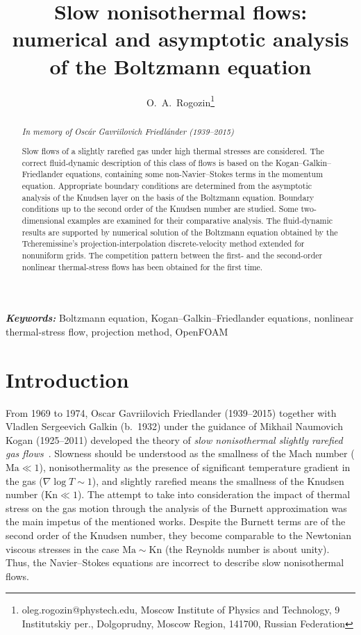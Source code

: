 \documentclass[10pt]{article}
\title{Slow nonisothermal flows: numerical and asymptotic analysis of the Boltzmann equation}
\author{O.~A.~Rogozin\thanks{oleg.rogozin@phystech.edu, Moscow Institute of Physics and Technology,
    9 Institutskiy per., Dolgoprudny, Moscow Region, 141700, Russian Federation}}
\date{}
\newcommand{\Kn}{\mathrm{Kn}}
\newcommand{\Ma}{\mathrm{Ma}}
\providecommand{\keywords}[1]{\textbf{\textit{Keywords:}} #1}
\begin{document}
\maketitle

\begin{abstract}
    \begin{flushright}
        {\it In memory of Osc\'{a}r Gavriilovich Friedl\'{a}nder (1939--2015)}
        \vspace{1em}
    \end{flushright}
    Slow flows of a slightly rarefied gas under high thermal stresses are considered.
    The correct fluid-dynamic description of this class of flows is based on the Kogan--Galkin--Friedlander equations,
    containing some non-Navier--Stokes terms in the momentum equation.
    Appropriate boundary conditions are determined from the asymptotic analysis of the Knudsen layer
    on the basis of the Boltzmann equation.
    Boundary conditions up to the second order of the Knudsen number are studied.
    Some two-dimensional examples are examined for their comparative analysis.
    The fluid-dynamic results are supported by numerical solution of the Boltzmann equation
    obtained by the Tcheremissine's projection-interpolation discrete-velocity method
    extended for nonuniform grids.
    The competition pattern between the first- and the second-order nonlinear thermal-stress flows
    has been obtained for the first time.
\end{abstract}

\keywords{
    Boltzmann equation,
    Kogan--Galkin--Friedlander equations,
    nonlinear thermal-stress flow,
    projection method,
    OpenFOAM
}

\section{Introduction}

From 1969 to 1974, Oscar Gavriilovich Friedlander (1939--2015) together with Vladlen Sergeevich Galkin (b.~1932)
under the guidance of Mikhail Naumovich Kogan (1925--2011) developed the theory of \emph{slow nonisothermal
slightly rarefied gas flows}~\cite{Kogan1970, Kogan1971, Friedlander1974, Galkin1974, Kogan1976}.
Slowness should be understood as the smallness of the Mach number (\(\Ma\ll1\)),
nonisothermality as the presence of significant temperature gradient in the gas (\(\nabla\log{T}\sim1\)),
and slightly rarefied means the smallness of the Knudsen number (\(\Kn\ll1\)).
The attempt to take into consideration the impact of thermal stress on the gas motion
through the analysis of the Burnett approximation was the main impetus of the mentioned works.
Despite the Burnett terms are of the second order of the Knudsen number,
they become comparable to the Newtonian viscous stresses in the case \(\Ma\sim\Kn\) (the Reynolds number is about unity).
Thus, the Navier--Stokes equations are incorrect to describe slow nonisothermal flows.
\end{document}
